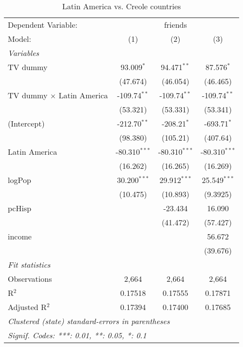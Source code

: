 \begin{table}[htbp]
\centering
\caption{Latin America vs. Creole countries}
\begin{tabular}{lccc}
\tabularnewline\midrule\midrule
Dependent Variable:&\multicolumn{3}{c}{friends}\\
Model:&(1) & (2) & (3)\\
\midrule \emph{Variables}&   &   &  \\
TV dummy & 93.009$^{*}$ & 94.471$^{**}$ & 87.576$^{*}$\\
  &(47.674) & (46.054) & (46.465)\\
TV dummy $\times$ Latin America & -109.74$^{**}$ & -109.74$^{**}$ & -109.74$^{**}$\\
  &(53.321) & (53.331) & (53.341)\\
(Intercept) & -212.70$^{**}$ & -208.21$^{*}$ & -693.71$^{*}$\\
  &(98.380) & (105.21) & (407.64)\\
Latin America & -80.310$^{***}$ & -80.310$^{***}$ & -80.310$^{***}$\\
  &(16.262) & (16.265) & (16.269)\\
logPop & 30.200$^{***}$ & 29.912$^{***}$ & 25.549$^{***}$\\
  &(10.475) & (10.893) & (9.3925)\\
pcHisp &    & -23.434 & 16.090\\
  &   & (41.472) & (57.427)\\
income &    &    & 56.672\\
  &   &    & (39.676)\\
\midrule \emph{Fit statistics}&  & & \\
Observations & 2,664&2,664&2,664\\
R$^2$ & 0.17518&0.17555&0.17871\\
Adjusted R$^2$ & 0.17394&0.17400&0.17685\\
\midrule\midrule\multicolumn{4}{l}{\emph{Clustered (state) standard-errors in parentheses}}\\
\multicolumn{4}{l}{\emph{Signif. Codes: ***: 0.01, **: 0.05, *: 0.1}}\\
\end{tabular}
\end{table}

